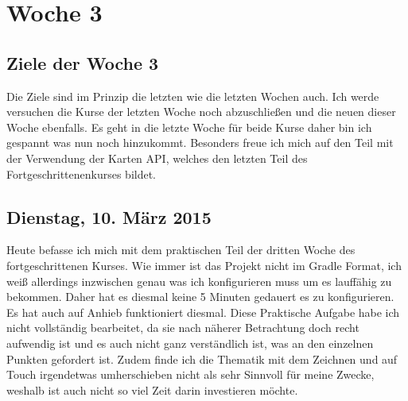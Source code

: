 \documentclass[12pt,a4paper,bibliography=totocnumbered,listof=totocnumbered]{scrartcl}
\begin{document}
\pagebreak

\section{Woche 3}

\subsection{Ziele der Woche 3}

Die Ziele sind im Prinzip die letzten wie die letzten Wochen auch. Ich werde versuchen die Kurse der letzten Woche noch abzuschließen und die neuen dieser Woche ebenfalls. Es geht in die letzte Woche für beide Kurse daher bin ich gespannt was nun noch hinzukommt. Besonders freue ich mich auf den Teil mit der Verwendung der Karten API, welches den letzten Teil des Fortgeschrittenenkurses bildet. 

\subsection{Dienstag, 10. März 2015}
Heute befasse ich mich mit dem praktischen Teil der dritten Woche des fortgeschrittenen Kurses. 
Wie immer ist das Projekt nicht im Gradle Format, ich weiß allerdings inzwischen genau was ich konfigurieren muss um es lauffähig zu bekommen. Daher hat es diesmal keine 5 Minuten gedauert es zu konfigurieren. 
Es hat auch auf Anhieb funktioniert diesmal. 
Diese Praktische Aufgabe habe ich nicht vollständig bearbeitet, da sie nach näherer Betrachtung doch recht aufwendig ist und es auch nicht ganz verständlich ist, was an den einzelnen Punkten gefordert ist. Zudem finde ich die Thematik mit dem Zeichnen und auf Touch irgendetwas umherschieben nicht als sehr Sinnvoll für meine Zwecke, weshalb ist auch nicht so viel Zeit darin investieren möchte. 
\end{document}
